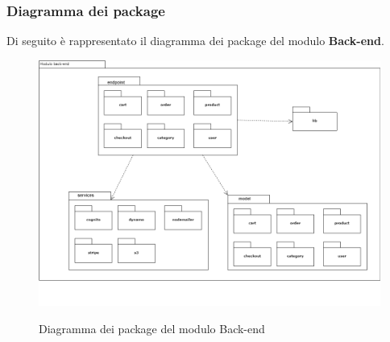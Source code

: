 \subsubsection{Diagramma dei package}
Di seguito è rappresentato il diagramma dei package del modulo \textbf{Back-end}.

\vspace{1cm}

\begin{figure}[H]
\centering
\includegraphics[scale=0.43]{res/Architettura/Backend/img/package-back-end.png}\\
\caption{Diagramma dei package del modulo Back-end}
\end{figure}